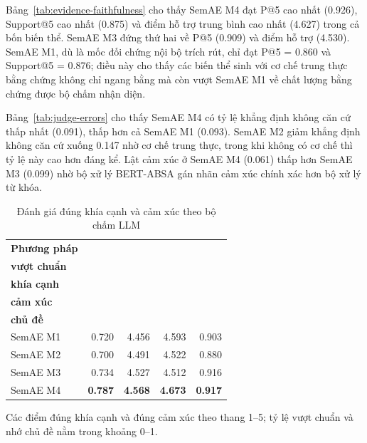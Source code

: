 Bảng~\ref{tab:evidence-faithfulness} cho thấy SemAE M4 đạt P@5 cao nhất (\num{0.926}), Support@5 cao nhất (\num{0.875}) và điểm hỗ trợ trung bình cao nhất (\num{4.627}) trong cả bốn biến thể. SemAE M3 đứng thứ hai về P@5 (\num{0.909}) và điểm hỗ trợ (\num{4.530}). SemAE M1, dù là mốc đối chứng nội bộ trích rút, chỉ đạt P@5 = \num{0.860} và Support@5 = \num{0.876}; điều này cho thấy các biến thể sinh với cơ chế trung thực bằng chứng không chỉ ngang bằng mà còn vượt SemAE M1 về chất lượng bằng chứng được bộ chấm nhận diện.

Bảng~\ref{tab:judge-errors} cho thấy SemAE M4 có tỷ lệ khẳng định không căn cứ thấp nhất (\num{0.091}), thấp hơn cả SemAE M1 (\num{0.093}). SemAE M2 giảm khẳng định không căn cứ xuống \num{0.147} nhờ cơ chế trung thực, trong khi không có cơ chế thì tỷ lệ này cao hơn đáng kể. Lật cảm xúc ở SemAE M4 (\num{0.061}) thấp hơn SemAE M3 (\num{0.099}) nhờ bộ xử lý BERT-ABSA gán nhãn cảm xúc chính xác hơn bộ xử lý từ khóa.

\begin{table}[tbp]
\centering
\caption{Đánh giá đúng khía cạnh và cảm xúc theo bộ chấm LLM}
\label{tab:summary-utility}
\begin{threeparttable}
\begin{tabular}{l r r r r}
\toprule
\textbf{Phương pháp} & \makecell{\textbf{Tỷ lệ}\\\textbf{vượt chuẩn}} & \makecell{\textbf{Đúng}\\\textbf{khía cạnh}} & \makecell{\textbf{Đúng}\\\textbf{cảm xúc}} & \makecell{\textbf{Nhớ}\\\textbf{chủ đề}} \\
\midrule
SemAE M1 & \num{0.720} & \num{4.456} & \num{4.593} & \num{0.903} \\
SemAE M2 & \num{0.700} & \num{4.491} & \num{4.522} & \num{0.880} \\
SemAE M3 & \num{0.734} & \num{4.527} & \num{4.512} & \num{0.916} \\
SemAE M4 & \textbf{\num{0.787}} & \textbf{\num{4.568}} & \textbf{\num{4.673}} & \textbf{\num{0.917}} \\
\bottomrule
\end{tabular}
\begin{tablenotes}
\footnotesize
\item Các điểm đúng khía cạnh và đúng cảm xúc theo thang 1--5; tỷ lệ vượt chuẩn và nhớ chủ đề nằm trong khoảng 0--1.
\end{tablenotes}
\end{threeparttable}
\end{table}

